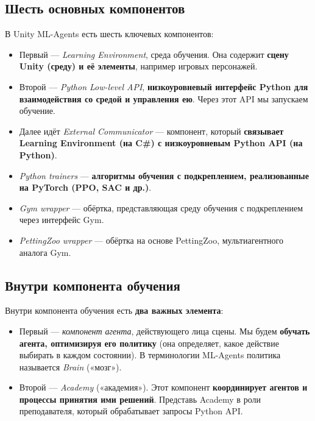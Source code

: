 \documentclass[11pt,a4paper]{article}
\begin{document}
\subsection{Шесть основных компонентов}\label{the-six-components}

В Unity ML-Agents есть шесть ключевых компонентов:


\begin{itemize}
\tightlist
\item
  Первый --- \emph{Learning Environment}, среда обучения. Она содержит \textbf{сцену Unity (среду) и её элементы}, например игровых персонажей.
\item
  Второй --- \emph{Python Low-level API}, \textbf{низкоуровневый интерфейс Python для взаимодействия со средой и управления ею}. Через этот API мы запускаем обучение.
\item
  Далее идёт \emph{External Communicator} --- компонент, который \textbf{связывает Learning Environment (на C\#) с низкоуровневым Python API (на Python)}.
\item
  \emph{Python trainers} --- \textbf{алгоритмы обучения с подкреплением, реализованные на PyTorch (PPO, SAC и др.)}.
\item
  \emph{Gym wrapper} --- обёртка, представляющая среду обучения с подкреплением через интерфейс Gym.
\item
  \emph{PettingZoo wrapper} --- обёртка на основе PettingZoo, мультиагентного аналога Gym.
\end{itemize}

\subsection{Внутри компонента обучения}\label{inside-the-learning-component}

Внутри компонента обучения есть \textbf{два важных элемента}:

\begin{itemize}
\tightlist
\item
  Первый --- \emph{компонент агента}, действующего лица сцены. Мы будем \textbf{обучать агента, оптимизируя его политику} (она определяет, какое действие выбирать в каждом состоянии). В терминологии ML-Agents политика называется \emph{Brain} («мозг»).
\item
  Второй --- \emph{Academy} («академия»). Этот компонент \textbf{координирует агентов и процессы принятия ими решений}. Представь Academy в роли преподавателя, который обрабатывает запросы Python API.
\end{itemize}
\end{document}
